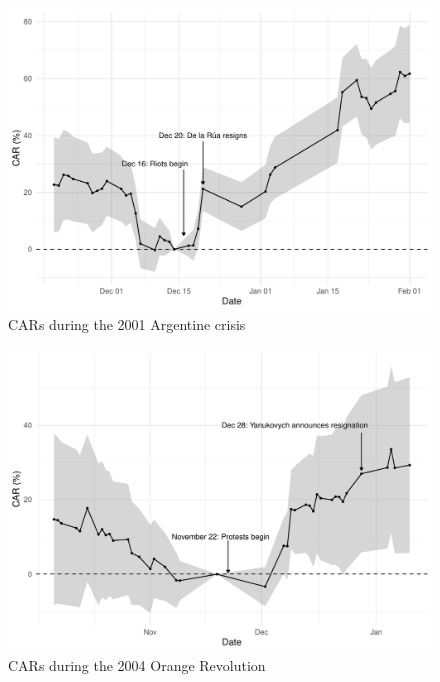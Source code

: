 \documentclass[12pt,final,fleqn]{article}
\theoremstyle{plain}
\begin{document}
\begin{figure}[!ht]
\centering
\includegraphics[scale=0.8]{../figs/argentina-2001.pdf}
\caption{CARs during the 2001 Argentine crisis}
\label{fig:CAR-Egypt}
\end{figure}

\begin{figure}[!ht]
\centering
\includegraphics[scale=0.8]{../figs/ukraine-2004.pdf}
\caption{CARs during the 2004 Orange Revolution}
\label{fig:CAR-Egypt}
\end{figure}
\end{document}
